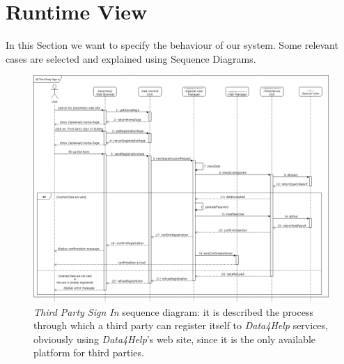 \clearpage

\section{Runtime View}\label{runtimeViewSection}
In this Section we want to specify the behaviour of our system. Some relevant cases are selected and explained using Sequence Diagrams.

\begin{figure}[H]
  \begin{center}
  	\includegraphics[width=\textwidth]{./img/sequence/webSignIn.png}
    \hspace{0.05\linewidth}
    \centering
    \caption{\textit{Third Party Sign In} sequence diagram: it is described the process through which a third party can register itself to \textit{Data4Help} services, obviously using \textit{Data4Help}'s web site, since it is the only available platform for third parties.}
		\label{img:webSignIn}
    \end{center}
\end{figure}

